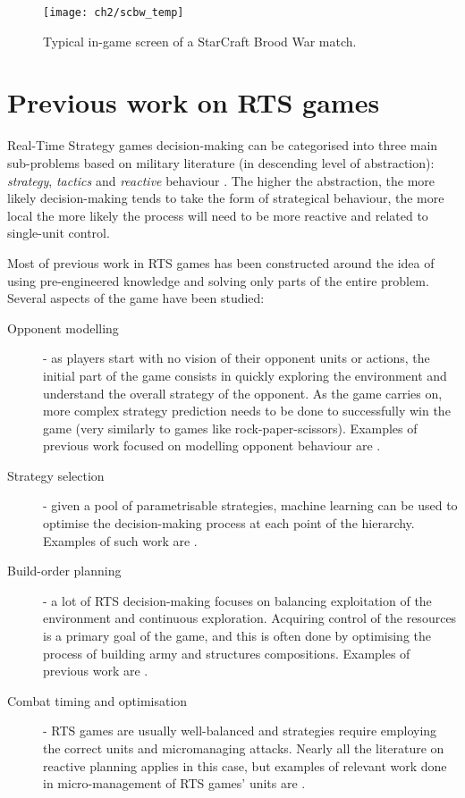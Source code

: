 \begin{figure}[h]
    \centering
    \texttt{[image: ch2/scbw\_temp]}
    \caption{Typical in-game screen of a StarCraft Brood War match.}
    \label{fig:ALE}
\end{figure}

\section{Previous work on RTS games}

Real-Time Strategy games decision-making can be categorised into three main
sub-problems based on military literature (in descending level of abstraction):
\emph{strategy}, \emph{tactics} and \emph{reactive} behaviour
\citep{handel2005masters}. The higher the abstraction, the more likely
decision-making tends to take the form of strategical behaviour, the more local
the more likely the process will need to be more reactive and related to
single-unit control.

Most of previous work in RTS games has been constructed around the idea of using
pre-engineered knowledge and solving only parts of the entire problem. Several
aspects of the game have been studied:

\begin{description}
\item [Opponent modelling] - as players start with no vision of their opponent
  units or actions, the initial part of the game consists in quickly exploring
  the environment and understand the overall strategy of the opponent. As the
  game carries on, more complex strategy prediction needs to be done to
  successfully win the game (very similarly to games like rock-paper-scissors). 
  Examples of previous work focused on modelling opponent behaviour are
  \cite{dereszynski2011learning, schadd2007opponent, synnaeve2012special}.
\item [Strategy selection] - given a pool of parametrisable strategies, machine
  learning can be used to optimise the decision-making process at each point of
  the hierarchy. Examples of such work are \cite{ontanon2008learning,
    weber2010reactive, young2012evolutionary}.
\item [Build-order planning] - a lot of RTS decision-making focuses on balancing
  exploitation of the environment and continuous exploration. Acquiring control
  of the resources is a primary goal of the game, and this is often done by
  optimising the process of building army and structures compositions. Examples
  of previous work are \cite{churchill2011build, kovarsky2006first,
    weber2009case}.
\item [Combat timing and optimisation] - RTS games are usually well-balanced and
  strategies require employing the correct units and micromanaging attacks.
  Nearly all the literature on reactive planning applies in this case, but
  examples of relevant work done in micro-management of RTS games' units are
  \cite{balla2009uct, certicky2013case, kovarsky2005heuristic}. 
\end{description}

